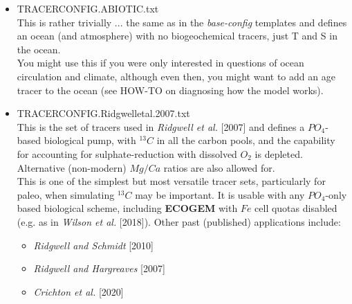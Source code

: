 \documentclass[11pt,fleqn]{book} %
\begin{document}
\begin{itemize}[noitemsep]

\vspace{2mm}
\item \textsf{\footnotesize TRACERCONFIG.ABIOTIC.txt}
\vspace{1mm}
\\This is rather trivially ... the same as in the \textit{base-config} templates and defines an ocean (and atmosphere) with no biogeochemical tracers, just T and S in the ocean.
\\You might use this if you were only interested in questions of ocean circulation and climate, although even then, you might want to add an age tracer to the ocean (see HOW-TO on diagnosing how the model works).

\vspace{2mm}
\item \textsf{\footnotesize TRACERCONFIG.Ridgwelletal.2007.txt}
\vspace{1mm}
\\This is the set of tracers used in \textit{Ridgwell et al.} [2007] and defines a \(PO_{4}\)-based biological pump, with \(^{13}C\) in all the carbon pools, and the capability for accounting for sulphate-reduction with dissolved \(O_{2}\) is depleted. Alternative (non-modern) \(Mg/Ca\) ratios are also allowed for.
\\This is one of the simplest but most versatile tracer sets, particularly for paleo, when simulating \(^{13}C\) may be important. It is usable with any \(PO_{4}\)-only based biological scheme, including \textbf{ECOGEM} with \(Fe\) cell quotas disabled (e.g. as in \textit{Wilson et al.} [2018]). Other past (published) applications include:
\begin{itemize}[noitemsep]
\item \textit{Ridgwell and Schmidt} [2010]
\item \textit{Ridgwell and Hargreaves} [2007]
\item \textit{Crichton et al.} [2020]
\end{itemize}


\end{itemize}
\end{document}
